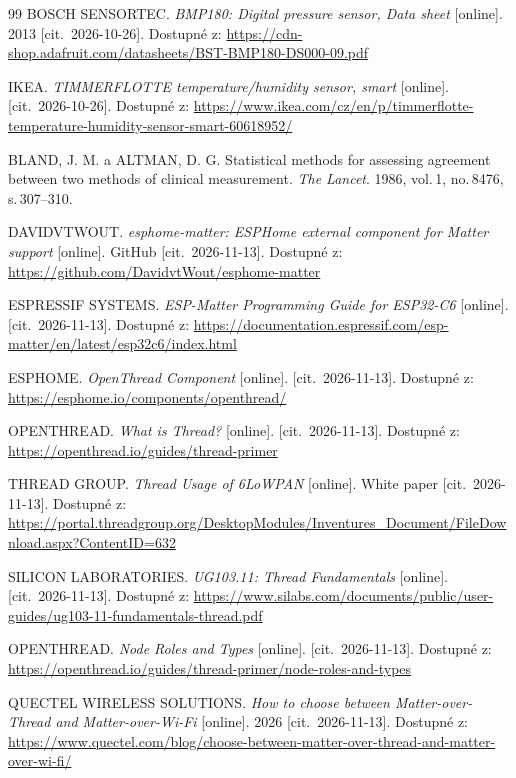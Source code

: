 \begin{thebibliography}{99}
BOSCH SENSORTEC. \emph{BMP180: Digital pressure sensor, Data sheet}
[online]. 2013 [cit.~2026-10-26].
Dostupné z: \url{https://cdn-shop.adafruit.com/datasheets/BST-BMP180-DS000-09.pdf}

IKEA. \emph{TIMMERFLOTTE temperature/humidity sensor, smart}
[online]. [cit.~2026-10-26].
Dostupné z: \url{https://www.ikea.com/cz/en/p/timmerflotte-temperature-humidity-sensor-smart-60618952/}

BLAND, J. M. a ALTMAN, D. G.
Statistical methods for assessing agreement between two methods of clinical measurement.
\emph{The Lancet}. 1986, vol.\,1, no.\,8476, s.\,307--310.

DAVIDVTWOUT. \emph{esphome-matter: ESPHome external component for Matter support}
[online]. GitHub [cit.~2026-11-13].
Dostupné z: \url{https://github.com/DavidvtWout/esphome-matter}

ESPRESSIF SYSTEMS. \emph{ESP-Matter Programming Guide for ESP32-C6}
[online]. [cit.~2026-11-13].
Dostupné z: \url{https://documentation.espressif.com/esp-matter/en/latest/esp32c6/index.html}

ESPHOME. \emph{OpenThread Component}
[online]. [cit.~2026-11-13].
Dostupné z: \url{https://esphome.io/components/openthread/}

OPENTHREAD. \emph{What is Thread?}
[online]. [cit.~2026-11-13].
Dostupné z: \url{https://openthread.io/guides/thread-primer}

THREAD GROUP. \emph{Thread Usage of 6LoWPAN}
[online]. White paper [cit.~2026-11-13].
Dostupné z: \url{https://portal.threadgroup.org/DesktopModules/Inventures_Document/FileDownload.aspx?ContentID=632}

SILICON LABORATORIES. \emph{UG103.11: Thread Fundamentals}
[online]. [cit.~2026-11-13].
Dostupné z: \url{https://www.silabs.com/documents/public/user-guides/ug103-11-fundamentals-thread.pdf}

OPENTHREAD. \emph{Node Roles and Types}
[online]. [cit.~2026-11-13].
Dostupné z: \url{https://openthread.io/guides/thread-primer/node-roles-and-types}

QUECTEL WIRELESS SOLUTIONS. \emph{How to choose between Matter-over-Thread and Matter-over-Wi-Fi}
[online]. 2026 [cit.~2026-11-13].
Dostupné z: \url{https://www.quectel.com/blog/choose-between-matter-over-thread-and-matter-over-wi-fi/}


\end{thebibliography}
